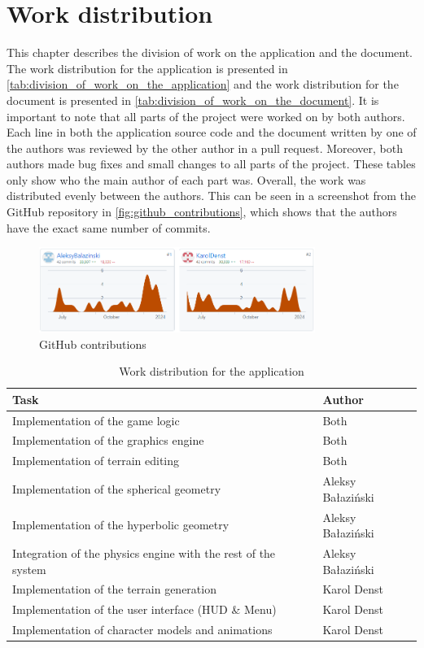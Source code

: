 \section{Work distribution}\label{sec:division_of_work}
This chapter describes the division of work on the application and the document.
The work distribution for the application is presented in \autoref{tab:division_of_work_on_the_application} and the work distribution for the document is presented in \autoref{tab:division_of_work_on_the_document}.
It is important to note that all parts of the project were worked on by both authors.
Each line in both the application source code and the document written by one of the authors was reviewed by the other author in a pull request.
Moreover, both authors made bug fixes and small changes to all parts of the project.
These tables only show who the main author of each part was.
Overall, the work was distributed evenly between the authors.
This can be seen in a screenshot from the GitHub repository in \autoref{fig:github_contributions}, which shows that the authors have the exact same number of commits.

\begin{figure}[h]
    \centering
    \includegraphics[width=0.8\textwidth]{chapters/introduction/work_distribution/resources/github_contributions.png}
    \caption{GitHub contributions}
    \label{fig:github_contributions}
\end{figure}

\begin{table}[h]
    \centering
    \begin{tabular}{|l|l|}
    \hline
    Task     & Author        \\ \hline
    Implementation of the game logic & Both \\
    Implementation of the graphics engine & Both \\
    Implementation of terrain editing & Both \\
    Implementation of the spherical geometry & Aleksy Bałaziński      \\
    Implementation of the hyperbolic geometry & Aleksy Bałaziński      \\
    Integration of the physics engine with the rest of the system & Aleksy Bałaziński      \\
    Implementation of the terrain generation & Karol Denst      \\
    Implementation of the user interface (HUD \& Menu) & Karol Denst      \\
    Implementation of character models and animations & Karol Denst      \\
    \hline
    \end{tabular}
    \caption{Work distribution for the application}
    \label{tab:division_of_work_on_the_application}
\end{table}
    
